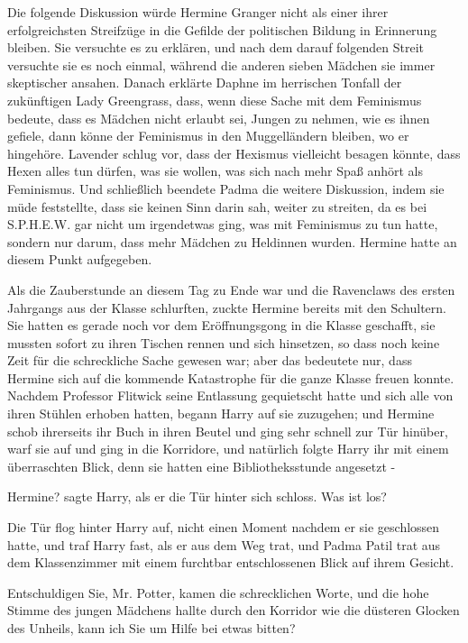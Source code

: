 Die folgende Diskussion würde Hermine Granger nicht als einer ihrer
erfolgreichsten Streifzüge in die Gefilde der politischen Bildung in Erinnerung
bleiben. Sie versuchte es zu erklären, und nach dem darauf folgenden Streit
versuchte sie es noch einmal, während die anderen sieben Mädchen sie immer
skeptischer ansahen. Danach erklärte Daphne im herrischen Tonfall der
zukünftigen Lady Greengrass, dass, wenn diese Sache mit dem Feminismus bedeute,
dass es Mädchen nicht erlaubt sei, Jungen zu nehmen, wie es ihnen gefiele, dann
könne der Feminismus in den Muggelländern bleiben, wo er hingehöre. Lavender
schlug vor, dass der Hexismus vielleicht besagen könnte, dass Hexen alles tun
dürfen, was sie wollen, was sich nach mehr Spaß anhört als Feminismus. Und
schließlich beendete Padma die weitere Diskussion, indem sie müde feststellte,
dass sie keinen Sinn darin sah, weiter zu streiten, da es bei S.P.H.E.W. gar
nicht um irgendetwas ging, was mit Feminismus zu tun hatte, sondern nur darum,
dass mehr Mädchen zu Heldinnen wurden. Hermine hatte an diesem Punkt aufgegeben.

Als die Zauberstunde an diesem Tag zu Ende war und die Ravenclaws des ersten
Jahrgangs aus der Klasse schlurften, zuckte Hermine bereits mit den Schultern.
Sie hatten es gerade noch vor dem Eröffnungsgong in die Klasse geschafft, sie
mussten sofort zu ihren Tischen rennen und sich hinsetzen, so dass noch keine
Zeit für die schreckliche Sache gewesen war; aber das bedeutete nur, dass
Hermine sich auf die kommende Katastrophe für die ganze Klasse freuen konnte.
Nachdem Professor Flitwick seine Entlassung gequietscht hatte und sich alle von
ihren Stühlen erhoben hatten, begann Harry auf sie zuzugehen; und Hermine schob
ihrerseits ihr Buch in ihren Beutel und ging sehr schnell zur Tür hinüber, warf
sie auf und ging in die Korridore, und natürlich folgte Harry ihr mit einem
überraschten Blick, denn sie hatten eine Bibliotheksstunde angesetzt -

\glqq Hermine?\grqq{} sagte Harry, als er die Tür hinter sich schloss. \glqq Was
ist los?\grqq{}

Die Tür flog hinter Harry auf, nicht einen Moment nachdem er sie geschlossen
hatte, und traf Harry fast, als er aus dem Weg trat, und Padma Patil trat aus
dem Klassenzimmer mit einem furchtbar entschlossenen Blick auf ihrem Gesicht.

\glqq Entschuldigen Sie, Mr. Potter\grqq{}, kamen die schrecklichen Worte, und
die hohe Stimme des jungen Mädchens hallte durch den Korridor wie die düsteren
Glocken des Unheils, \glqq kann ich Sie um Hilfe bei etwas bitten?\grqq{}


